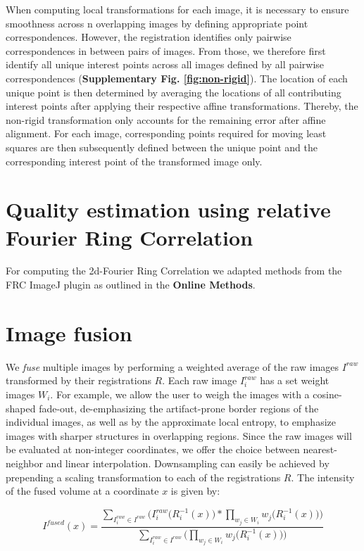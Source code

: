 When computing local transformations for each image, it is necessary to ensure smoothness across n overlapping images by defining appropriate point correspondences. However, the registration identifies only pairwise correspondences in between pairs of images. From those, we therefore first identify all unique interest points across all images defined by all pairwise correspondences (\textbf{Supplementary Fig. \ref{fig:non-rigid}}). The location of each unique point is then determined by averaging the locations of all contributing interest points after applying their respective affine transformations. Thereby, the non-rigid transformation only accounts for the remaining error after affine alignment. For each image, corresponding points required for moving least squares are then subsequently defined between the unique point and the corresponding interest point of the transformed image only.



\section{Quality estimation using relative Fourier Ring Correlation}
\label{sec:frc}

For computing the 2d-Fourier Ring Correlation\cite{Nieuwenhuizen:2013ko} we adapted methods from the FRC ImageJ plugin\cite{frcij} as outlined in the \textbf{Online Methods}.  


\section{Image fusion}
\label{sec:fusion}

We \emph{fuse} multiple images by performing a weighted average of the raw images $I^{raw}$ transformed by their registrations $R$. Each raw image $I^{raw}_i$ has a set weight images $W_i$. For example, we allow the user to weigh the images with a cosine-shaped fade-out, de-emphasizing the artifact-prone border regions of the individual images, as well as by the approximate local entropy, to emphasize images with sharper structures in overlapping regions. Since the raw images will be evaluated at non-integer coordinates, we offer the choice between nearest-neighbor and linear interpolation. Downsampling can easily be achieved by prepending a scaling transformation to each of the registrations $R$. The intensity of the fused volume at a coordinate $x$ is given by:

\begin{equation}
\label{eq:fusion-eq1}
I^{fused}(x) ={ \frac{  \sum_{ I^{raw}_i \in I^{raw}} \Big(I^{raw}_i\big(R_i^{-1}(x)\big) * \prod_{w_j \in W_i}{w_j\big(R_i^{-1}(x)\big)\Big)}}{ \sum_{I^{raw}_i \in I^{raw}}\Big( \prod_{w_j \in W_i}{w_j\big(R_i^{-1}(x)\big)\Big)}}}
\end{equation}

